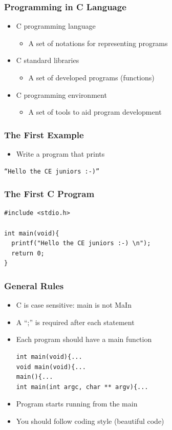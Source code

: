 \documentclass{../c-lecture}
\begin{document}
\begin{frame}
  \frametitle{Programming in C Language}
  \begin{itemize}
    \item C programming language
    \begin{itemize}
      \item A set of notations for representing programs
    \end{itemize}
    \item C standard libraries
    \begin{itemize}
      \item A set of developed programs (functions)
    \end{itemize}
    \item C programming environment
    \begin{itemize}
      \item A set of tools to aid program development
    \end{itemize}
  \end{itemize}
\end{frame}

\begin{frame}[fragile]
  \frametitle{The First Example}
  \begin{itemize}
    \item Write a program that prints
  \end{itemize}
  \begin{verbatim}
“Hello the CE juniors :-)”
  \end{verbatim}
\end{frame}

\begin{frame}[fragile]
  \frametitle{The First C Program}
  \begin{verbatim}
#include <stdio.h>

int main(void){
  printf("Hello the CE juniors :-) \n");
  return 0;
}
  \end{verbatim}
\end{frame}

\begin{frame}[fragile]
  \frametitle{General Rules}
  \begin{itemize}
    \item C is case sensitive: {\color{LimeGreen} main} is not
      {\color{Red} MaIn}
    \item A ``;'' is required after each statement
    \item Each program should have a
      {\color{Orange} main} function
    \begin{verbatim}
int main(void){...
void main(void){...
main(){...
int main(int argc, char ** argv){...
    \end{verbatim}
    \item Program starts running from the main
    \item You should follow coding style (beautiful code)
  \end{itemize}
\end{frame}
\end{document}
